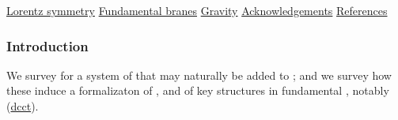 \documentclass[12pt,titlepage]{article}
\theoremstyle{plain}
\theoremstyle{definition}
\theoremstyle{remark}
\begin{document}
\noindent\hyperlink{lorentz_symmetry}{Lorentz symmetry}\dotfill \pageref*{lorentz_symmetry} \linebreak
\noindent\hyperlink{fundamental_branes}{Fundamental branes}\dotfill \pageref*{fundamental_branes} \linebreak
\noindent\hyperlink{gravity}{Gravity}\dotfill \pageref*{gravity} \linebreak
\noindent\hyperlink{acknowledgements}{Acknowledgements}\dotfill \pageref*{acknowledgements} \linebreak
\noindent\hyperlink{references}{References}\dotfill \pageref*{references} \linebreak
\hypertarget{introduction}{}\subsubsection*{{Introduction}}\label{introduction}
We survey  for a system of  that may naturally be added to ; and we survey how these induce a  formalizaton of ,  and of key structures in fundamental , notably     (\hyperlink{dcct}{dcct}).
\end{document}

